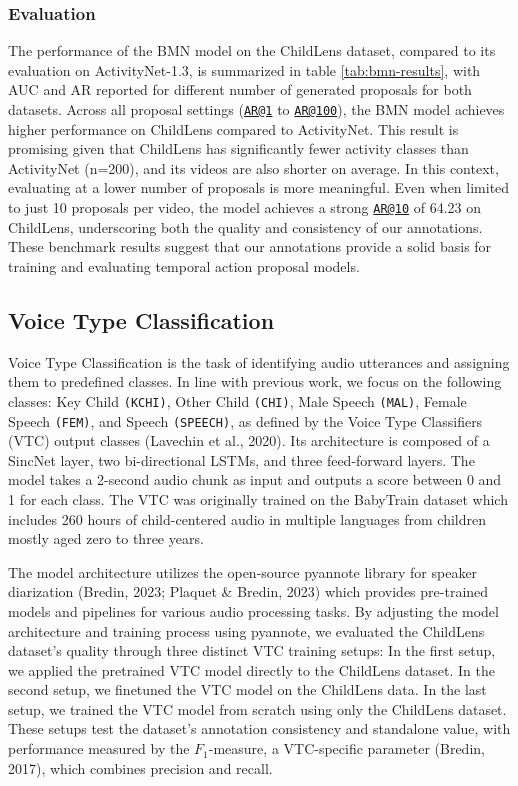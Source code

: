 \documentclass[
  man,floatsintext]{apa6}
\begin{document}
\subsubsection{Evaluation}\label{evaluation}

The performance of the BMN model on the ChildLens dataset, compared to its evaluation on ActivityNet-1.3, is summarized in table \ref{tab:bmn-results}, with AUC and AR reported for different number of generated proposals for both datasets. Across all proposal settings (\href{mailto:AR@1}{\nolinkurl{AR@1}} to \href{mailto:AR@100}{\nolinkurl{AR@100}}), the BMN model achieves higher performance on ChildLens compared to ActivityNet. This result is promising given that ChildLens has significantly fewer activity classes than ActivityNet (n=200), and its videos are also shorter on average. In this context, evaluating at a lower number of proposals is more meaningful. Even when limited to just 10 proposals per video, the model achieves a strong \href{mailto:AR@10}{\nolinkurl{AR@10}} of 64.23 on ChildLens, underscoring both the quality and consistency of our annotations. These benchmark results suggest that our annotations provide a solid basis for training and evaluating temporal action proposal models.

\subsection{Voice Type Classification}\label{voice-type-classification}

Voice Type Classification is the task of identifying audio utterances and assigning them to predefined classes. In line with previous work, we focus on the following classes: Key Child \texttt{(KCHI)}, Other Child \texttt{(CHI)}, Male Speech \texttt{(MAL)}, Female Speech \texttt{(FEM)}, and Speech \texttt{(SPEECH)}, as defined by the Voice Type Classifiers (VTC) output classes (Lavechin et al., 2020). Its architecture is composed of a SincNet layer, two bi-directional LSTMs, and three feed-forward layers. The model takes a 2-second audio chunk as input and outputs a score between 0 and 1 for each class. The VTC was originally trained on the BabyTrain dataset which includes 260 hours of child-centered audio in multiple languages from children mostly aged zero to three years.

The model architecture utilizes the open-source pyannote library for speaker diarization (Bredin, 2023; Plaquet \& Bredin, 2023) which provides pre-trained models and pipelines for various audio processing tasks. By adjusting the model architecture and training process using pyannote, we evaluated the ChildLens dataset's quality through three distinct VTC training setups: In the first setup, we applied the pretrained VTC model directly to the ChildLens dataset. In the second setup, we finetuned the VTC model on the ChildLens data. In the last setup, we trained the VTC model from scratch using only the ChildLens dataset. These setups test the dataset's annotation consistency and standalone value, with performance measured by the \(F_1\)-measure, a VTC-specific parameter (Bredin, 2017), which combines precision and recall.
\end{document}
